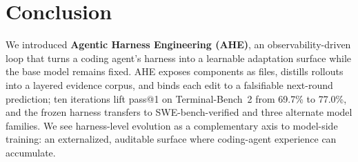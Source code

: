 \section{Conclusion}

We introduced \textbf{Agentic Harness Engineering (AHE)}, an observability-driven loop that turns a coding agent's harness into a learnable adaptation surface while the base model remains fixed. AHE exposes components as files, distills rollouts into a layered evidence corpus, and binds each edit to a falsifiable next-round prediction; ten iterations lift pass@1 on Terminal-Bench~2 from 69.7\% to 77.0\%, and the frozen harness transfers to SWE-bench-verified and three alternate model families. We see harness-level evolution as a complementary axis to model-side training: an externalized, auditable surface where coding-agent experience can accumulate.

